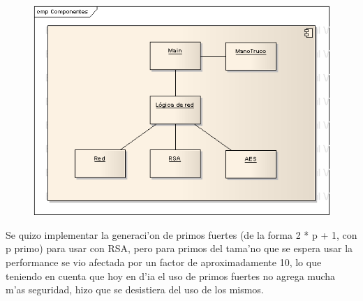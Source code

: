 \begin{figure}
\includegraphics{Componentes.png}
\end{figure}

Se quizo implementar la generaci'on de primos fuertes (de la forma 2 * p + 1, con p primo) para usar con RSA, pero para primos del tama'no que se espera usar la performance se vio afectada por un factor de aproximadamente 10, lo que teniendo en cuenta que hoy en d'ia el uso de primos fuertes no agrega mucha m'as seguridad, hizo que se desistiera del uso de los mismos.